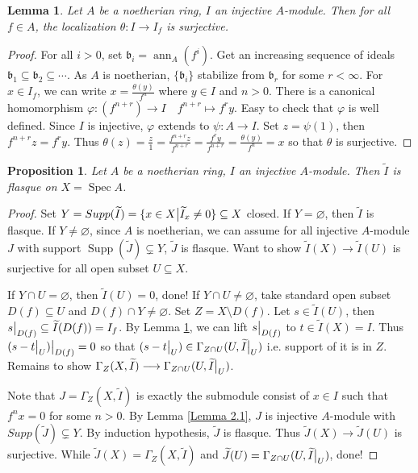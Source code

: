 \documentclass{ctexart}
\newtheorem{proposition}{Proposition}[section]
\newtheorem{lemma}{Lemma}[section]
\newcommand{\spec}{\operatorname{Spec}}
\newcommand{\support}{\operatorname{Supp}}
\newcommand{\annihilator}{\operatorname{ann}}
\begin{document}
\begin{lemma}
    Let $A$ be a noetherian ring, $I$ an injective $A$-module.
    Then for all $f\in A$, the localization $\theta: I \longrightarrow I_{f}$ is surjective.
    \label{Lemma 2.2}
\end{lemma}
\begin{proof}
    For all $i > 0$, set $\mathfrak{b}_{i} = \annihilator_{A}(f^{i})$.
    Get an increasing sequence of ideals $\mathfrak{b}_{1} \subseteq \mathfrak{b}_{2} \subseteq \cdots$.
    As $A$ is noetherian, $\{\mathfrak{b}_{i}\}$ stabilize from $\mathfrak{b}_{r}$ for some $r < \infty$.
    For $x\in I_{f}$, we can write $x = \frac{\theta(y)}{f^{n}}$ where $y\in I$ and $n > 0$.
    There is a canonical homomorphism $\varphi: (f^{n + r}) \longrightarrow I\quad f^{n + r} \longmapsto f^{r}y$.
    Easy to check that $\varphi$ is well defined.
    Since $I$ is injective, $\varphi$ extends to $\psi: A \longrightarrow I$.
    Set $z = \psi(1)$, then $f^{n + r}z = f^{r}y$.
    Thus $\theta(z) = \frac{z}{1} = \frac{f^{n + r}z}{f^{n + r}} = \frac{f^{r}y}{f^{n + r}} = \frac{\theta(y)}{f^{n}} = x$ so that $\theta$ is surjective.
\end{proof}
\begin{proposition}
    Let $A$ be a noetherian ring, $I$ an injective $A$-module.
    Then $\widetilde{I}$ is flasque on $X = \spec A$.
    \label{Proposition 2.6}
\end{proposition}
\begin{proof}
    Set $Y = Supp(\widetilde{I}) = \{x\in X \big{|} \widetilde{I}_{x} \neq 0\} \subseteq X$ closed.
    If $Y = \varnothing$, then $\widetilde{I}$ is flasque.
    If $Y \neq \varnothing$, since $A$ is noetherian, we can assume for all injective $A$-module $J$ with support $\support (\widetilde{J}) \subsetneq Y$, $\widetilde{J}$ is flasque.
    Want to show $\widetilde{I}(X) \longrightarrow \widetilde{I}(U)$ is surjective for all open subset $U \subseteq X$.
    \par
    If $Y \cap U = \varnothing$, then $\widetilde{I}(U) = 0$, done!
    If $Y \cap U \neq \varnothing$, take standard open subset $D(f) \subseteq U$ and $D(f) \cap Y \neq \varnothing$.
    Set $Z = X \setminus D(f)$.
    Let $s\in \widetilde{I}(U)$, then $s\big{|}_{D(f)} \subseteq \widetilde{I}(D(f)) = I_{f}$.
    By Lemma \ref{Lemma 2.2}, we can lift $s\big{|}_{D(f)}$ to $t\in \widetilde{I}(X) = I$.
    Thus $(s - t\big{|}_{U})\big{|}_{D(f)} = 0$ so that $(s - t\big{|}_{U})\in \Gamma_{Z \cap U}(U, \widetilde{I}\big{|}_{U})$ i.e. support of it is in $Z$.
    Remains to show $\Gamma_{Z}(X, \widetilde{I}) \longrightarrow \Gamma_{Z \cap U}(U, \widetilde{I}\big{|}_{U})$.
    \par
    Note that $J = \Gamma_{Z}(X, \widetilde{I})$ is exactly the submodule consist of $x\in I$ such that $f^{n}x = 0$ for some $n > 0$.
    By Lemma \ref{Lemma 2.1}, $J$ is injective $A$-module with $Supp(\widetilde{J}) \subsetneq Y$.
    By induction hypothesis, $\widetilde{J}$ is flasque.
    Thus $\widetilde{J}(X) \longrightarrow \widetilde{J}(U)$ is surjective.
    While $\widetilde{J}(X) = \Gamma_{Z}(X, \widetilde{I})$ and $\widetilde{J}(U) = \Gamma_{Z \cap U}(U, \widetilde{I}\big{|}_{U})$, done!
\end{proof}
\end{document}
